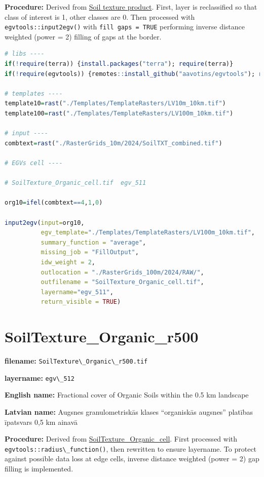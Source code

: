 \documentclass[
]{book}
\newcommand{\passthrough}[1]{#1}
\begin{document}
\textbf{Procedure:} Derived from \hyperref[Ch05.02]{Soil texture product}. First, layer is
reclassified so that class of interest is 1, other classes are 0. Then processed
with \passthrough{\lstinline!egvtools::input2egv()!} with \passthrough{\lstinline!fill gaps = TRUE!} performing inverse
distance weighted (power = 2) filling of gaps at the border.

\begin{lstlisting}[language=R]
# libs ----
if(!require(terra)) {install.packages("terra"); require(terra)}
if(!require(egvtools)) {remotes::install_github("aavotins/egvtools"); require(egvtools)}

# templates ----
template10=rast("./Templates/TemplateRasters/LV10m_10km.tif")
template100=rast("./Templates/TemplateRasters/LV100m_10km.tif")

# input ----
combtext=rast("./RasterGrids_10m/2024/SoilTXT_combined.tif")

# EGVs cell ----

# SoilTexture_Organic_cell.tif  egv_511

org10=ifel(combtext==4,1,0)

input2egv(input=org10,
          egv_template="./Templates/TemplateRasters/LV100m_10km.tif",
          summary_function = "average",
          missing_job = "FillOutput",
          idw_weight = 2,
          outlocation = "./RasterGrids_100m/2024/RAW/",
          outfilename = "SoilTexture_Organic_cell.tif",
          layername="egv_511",
          return_visible = TRUE)
\end{lstlisting}

\section{SoilTexture\_Organic\_r500}\label{ch06.512}

\textbf{filename:} \passthrough{\lstinline!SoilTexture\_Organic\_r500.tif!}

\textbf{layername:} \passthrough{\lstinline!egv\_512!}

\textbf{English name:} Fractional cover of Organic Soils within the 0.5 km landscape

\textbf{Latvian name:} Augsnes granulometriskās klases ``organiskās augsnes'' platības īpatsvars 0,5 km ainavā

\textbf{Procedure:} Derived from \hyperref[ch06.511]{SoilTexture\_Organic\_cell}. First processed
with \passthrough{\lstinline!egvtools::radius\_function()!}, then rewritten to ensure layername. To protect against
possible data loss at edge cells, inverse distance weighted (power = 2) gap filling
is implemented.
\end{document}

